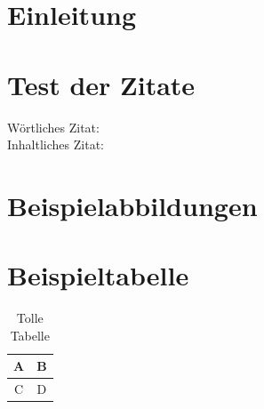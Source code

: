 \documentclass[12pt, ngerman]{article}
\begin{document}


\setcounter{page}{2}

\abstract
\clearpage
\tableofcontents
\clearpage
{}
\section{Einleitung}
\clearpage

\section{Test der Zitate}
Wörtliches Zitat:  \\
Inhaltliches Zitat: 

\section{Beispielabbildungen}

\section{Beispieltabelle}
\begin{table}[h!]
    \centering
    \begin{tabular}{|c|c|}
        A & B \\ \hline
        C & D
    \end{tabular}
    \caption{Tolle Tabelle}
\end{table}


\clearpage
\printbibliography[title=\section{Literaturverzeichnis}]
\listoffigures
\listoftables
\end{document}
